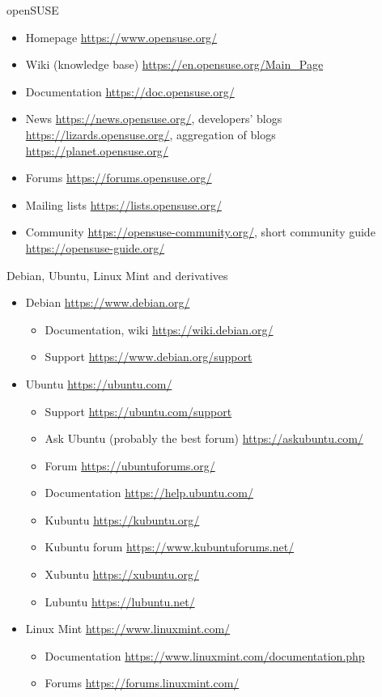 \documentclass[compress, ucs, xelatex, 11pt, xcolor=svgnames, aspectratio=169,
	hyperref={
		bookmarks=true,
		unicode=true,
		colorlinks=true,
		pdftitle={Linux, command line and MetaCentrum},
		plainpages=false,
		pdfauthor={Vojtech Zeisek},
		pdfsubject={Course about use of Linux command line, writing shell scripts and using MetaCentrum of CESNET},
		pdfcreator={XeLaTeX},
		pdfkeywords={Linux, GNU, BASH, shell, command line, MetaCentrum},
		linkcolor=DarkRed, %
		anchorcolor=DarkBlue, %
		citecolor=Indigo, %
		filecolor=NavyBlue, %
		menucolor=DarkMagenta, %
		urlcolor=DarkBlue, %
		pdftex},
	url={hyphens, lowtilde} %
	]{beamer}
\begin{document}
\begin{frame}{openSUSE}
	\begin{itemize}
		\item Homepage \url{https://www.opensuse.org/}
		\item Wiki (knowledge base) \url{https://en.opensuse.org/Main_Page}
		\item Documentation \url{https://doc.opensuse.org/}
		\item News \url{https://news.opensuse.org/}, developers' blogs \url{https://lizards.opensuse.org/}, aggregation of blogs \url{https://planet.opensuse.org/}
		\item Forums \url{https://forums.opensuse.org/}
		\item Mailing lists \url{https://lists.opensuse.org/}
		\item Community \url{https://opensuse-community.org/}, short community guide \url{https://opensuse-guide.org/}
	\end{itemize}
\end{frame}

\begin{frame}{Debian, Ubuntu, Linux Mint and derivatives}
	\begin{itemize}
		\item Debian \url{https://www.debian.org/}
		\begin{itemize}
			\item Documentation, wiki \url{https://wiki.debian.org/}
			\item Support \url{https://www.debian.org/support}
		\end{itemize}
		\item Ubuntu \url{https://ubuntu.com/}
		\begin{itemize}
			\item Support \url{https://ubuntu.com/support}
			\item Ask Ubuntu (probably the best forum) \url{https://askubuntu.com/}
			\item Forum \url{https://ubuntuforums.org/}
			\item Documentation \url{https://help.ubuntu.com/}
			\item Kubuntu \url{https://kubuntu.org/}
			\item Kubuntu forum \url{https://www.kubuntuforums.net/}
			\item Xubuntu \url{https://xubuntu.org/}
			\item Lubuntu \url{https://lubuntu.net/}
		\end{itemize}
		\item Linux Mint \url{https://www.linuxmint.com/}
		\begin{itemize}
			\item Documentation \url{https://www.linuxmint.com/documentation.php}
			\item Forums \url{https://forums.linuxmint.com/}
		\end{itemize}
	\end{itemize}
\end{frame}
\end{document}
